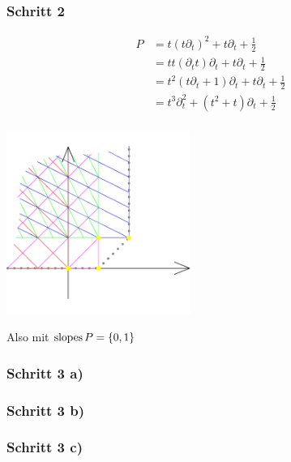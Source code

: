 \subsubsection{Schritt 2}
\begin{minipage}[hbt]{0,39\textwidth}
  \begin{align*}
   P &= t(t\partial_t)^2                + t\partial_t           + \frac{1}{2}\\
     &= tt(\partial_tt)\partial_t       + t\partial_t           + \frac{1}{2}\\
     &= t^2(t\partial_t + 1)\partial_t  + t\partial_t           + \frac{1}{2}\\
     &= t^3\partial_t^2                 + (t^2 + t)\partial_t   + \frac{1}{2}\\
  \end{align*}
\end{minipage}
\begin{minipage}[hbt]{0,59\textwidth}
  \begin{center}
    \includegraphics[width=6cm]{beispiele/img/formal_a-2.png}
  \end{center}
\end{minipage}
Also mit $\operatorname{slopes}{P}=\{0,1\}$

\subsubsection{Schritt 3 a)}
\subsubsection{Schritt 3 b)}
\subsubsection{Schritt 3 c)}

